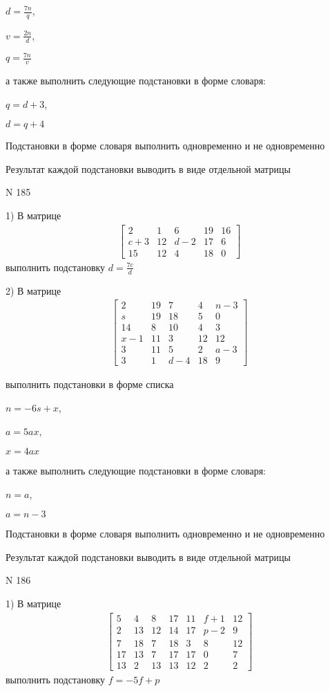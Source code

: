 \documentclass[11pt]{report}
\begin{document}
$d=\frac{7 n}{q}$,

$v=\frac{2 n}{d}$,

$q=\frac{7 n}{v}$

а также выполнить следующие подстановки в форме словаря:

$q=d + 3$,

$d=q + 4$


    Подстановки в форме словаря выполнить одновременно и не одновременно


    Результат каждой подстановки выводить в виде отдельной матрицы

\newpage
N 185


    1) В матрице
\begin{align*}
\left[\begin{matrix}2 & 1 & 6 & 19 & 16\\c + 3 & 12 & d - 2 & 17 & 6\\15 & 12 & 4 & 18 & 0\end{matrix}\right]
\end{align*}
выполнить подстановку $d=\frac{7 c}{d}$


    2) В матрице
\begin{align*}
\left[\begin{matrix}2 & 19 & 7 & 4 & n - 3\\s & 19 & 18 & 5 & 0\\14 & 8 & 10 & 4 & 3\\x - 1 & 11 & 3 & 12 & 12\\3 & 11 & 5 & 2 & a - 3\\3 & 1 & d - 4 & 18 & 9\end{matrix}\right]
\end{align*}

выполнить подстановки в форме списка

$n=- 6 s + x$,

$a=5 a x$,

$x=4 a x$

а также выполнить следующие подстановки в форме словаря:

$n=a$,

$a=n - 3$


    Подстановки в форме словаря выполнить одновременно и не одновременно


    Результат каждой подстановки выводить в виде отдельной матрицы

\newpage
N 186


    1) В матрице
\begin{align*}
\left[\begin{matrix}5 & 4 & 8 & 17 & 11 & f + 1 & 12\\2 & 13 & 12 & 14 & 17 & p - 2 & 9\\7 & 18 & 7 & 18 & 3 & 8 & 12\\17 & 13 & 7 & 17 & 17 & 0 & 7\\13 & 2 & 13 & 13 & 12 & 2 & 2\end{matrix}\right]
\end{align*}
выполнить подстановку $f=- 5 f + p$
\end{document}
